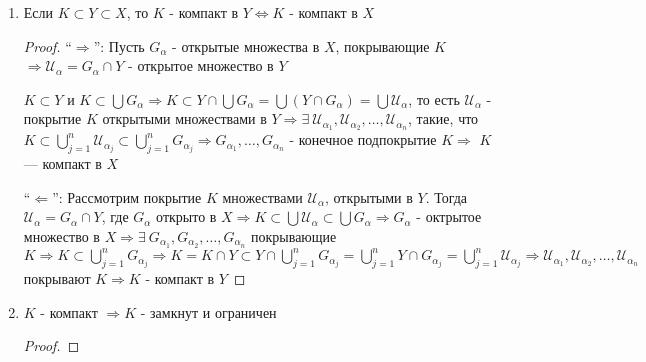 \begin{theorem-non} \quad 

    \begin{enumerate}
        \item Если $K \subset Y \subset X$, то $K$ - компакт в $Y \Longleftrightarrow K$ - компакт в $X$ 
        \begin{proof} \quad
            
            ``$\Longrightarrow$'': Пусть $G_{\alpha}$ - открытые множества в $X$, покрывающие $K$
            $\Longrightarrow \mathcal{U}_{\alpha} = G_{\alpha}\cap Y$ - открытое множество в $Y$

            $K \subset Y$ и $K \subset \bigcup G_{\alpha} \Longrightarrow K \subset Y \cap \bigcup G_{\alpha} =
            \bigcup (Y \cap G_{\alpha}) = \bigcup \mathcal{U}_{\alpha}$, то есть $\mathcal{U}_{\alpha}$ - 
            покрытие $K$ открытыми множествами в $Y \Longrightarrow \exists \ \mathcal{U}_{\alpha_1}, \mathcal{U}_{\alpha_2}, \dots, \mathcal{U}_{\alpha_n}$, 
            такие, что $K \subset \bigcup\limits_{j = 1}^{n} \mathcal{U}_{\alpha_j} \subset \bigcup\limits_{j = 1}^{n} G_{\alpha_j} \Longrightarrow 
            G_{\alpha_1}, \dots, G_{\alpha_n}$ - конечное подпокрытие $K \Longrightarrow$ $K$ --- компакт в $X$

            ``$\Longleftarrow$'': Рассмотрим покрытие $K$ множествами $\mathcal{U}_{\alpha}$, открытыми в $Y$. Тогда $\mathcal{U}_{\alpha} = G_{\alpha} \cap Y$, 
            где $G_{\alpha}$ открыто в $X \Longrightarrow K \subset \bigcup \mathcal{U}_{\alpha} \subset \bigcup G_{\alpha} \Longrightarrow
            G_{\alpha}$ - октрытое множество в $X \Longrightarrow \exists \ G_{\alpha_1}, G_{\alpha_2}, \dots, G_{\alpha_n}$ покрывающие $K \Longrightarrow
            K \subset \bigcup\limits_{j=1}^{n} G_{\alpha_j} \Longrightarrow K = K \cap Y \subset 
            Y \cap \bigcup\limits_{j=1}^{n} G_{\alpha_j} = \bigcup\limits_{j=1}^{n} Y \cap G_{\alpha_j} = \bigcup\limits_{j=1}^{n} \mathcal{U}_{\alpha_j}
            \Longrightarrow \mathcal{U}_{\alpha_1}, \mathcal{U}_{\alpha_2}, \dots, \mathcal{U}_{\alpha_n}$ покрывают $K \Longrightarrow K$ - компакт в $Y$  
        \end{proof}
        \item $K$ - компакт $\Longrightarrow K$ - замкнут и ограничен
        \begin{proof} \quad


\end{proof}
\end{enumerate}
\end{theorem-non}
